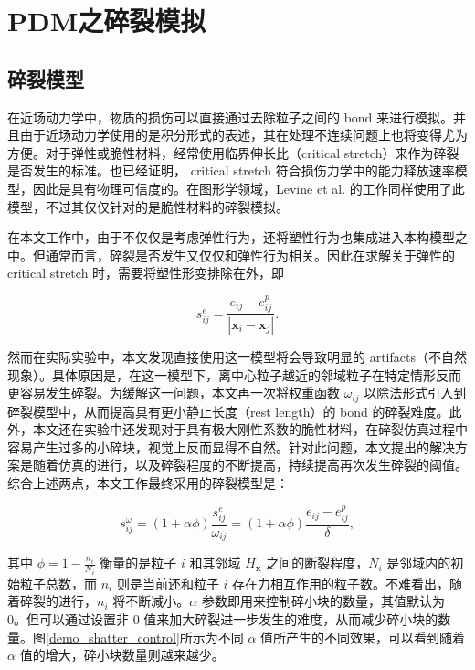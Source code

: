 ﻿\chapter{PDM之碎裂模拟}
\section{碎裂模型}
在近场动力学中，物质的损伤可以直接通过去除粒子之间的 bond 来进行模拟。并且由于近场动力学使用的是积分形式的表述，其在处理不连续问题上也将变得尤为方便。对于弹性或脆性材料，经常使用临界伸长比（critical stretch）来作为碎裂是否发生的标准。也已经证明， critical stretch 符合损伤力学中的能力释放速率模型，因此是具有物理可信度的。在图形学领域，Levine et al. 的工作同样使用了此模型，不过其仅仅针对的是脆性材料的碎裂模拟。

在本文工作中，由于不仅仅是考虑弹性行为，还将塑性行为也集成进入本构模型之中。但通常而言，碎裂是否发生又仅仅和弹性行为相关。因此在求解关于弹性的 critical stretch 时，需要将塑性形变排除在外，即

\begin{equation}
s_{ij}^e =\frac{e_{ij}-e_{ij}^p}{|\mathbf{x}_i-\mathbf{x}_j|}.
\end{equation}

然而在实际实验中，本文发现直接使用这一模型将会导致明显的 artifacts（不自然现象）。具体原因是，在这一模型下，离中心粒子越近的邻域粒子在特定情形反而更容易发生碎裂。为缓解这一问题，本文再一次将权重函数 $\omega_{ij}$ 以除法形式引入到碎裂模型中，从而提高具有更小静止长度（rest length）的 bond 的碎裂难度。此外，本文还在实验中还发现对于具有极大刚性系数的脆性材料，在碎裂仿真过程中容易产生过多的小碎块，视觉上反而显得不自然。针对此问题，本文提出的解决方案是随着仿真的进行，以及碎裂程度的不断提高，持续提高再次发生碎裂的阈值。综合上述两点，本文工作最终采用的碎裂模型是：

\begin{equation}
s_{ij}^\omega = (1 + \alpha\phi)\frac{s_{ij}^e}{\omega_{ij}} = (1 + \alpha\phi)\frac{e_{ij}-e_{ij}^p}{\delta},
\end{equation}

其中 $\phi = 1 - \frac{n_i}{N_i}$ 衡量的是粒子 $i$ 和其邻域 $H_\mathbf{x}$ 之间的断裂程度，$N_i$ 是邻域内的初始粒子总数，而 $n_i$ 则是当前还和粒子 $i$ 存在力相互作用的粒子数。不难看出，随着碎裂的进行，$n_i$ 将不断减小。$\alpha$ 参数即用来控制碎小块的数量，其值默认为 0。但可以通过设置非 0 值来加大碎裂进一步发生的难度，从而减少碎小块的数量。图\ref{demo_shatter_control}所示为不同 $\alpha$ 值所产生的不同效果，可以看到随着 $\alpha$ 值的增大，碎小块数量则越来越少。

